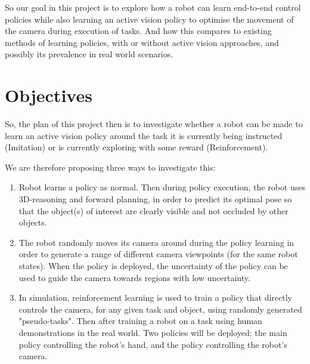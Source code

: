   So our goal in this project is to explore how a robot can learn end-to-end control policies while also learning an active vision policy to optimise the movement of the camera during execution of tasks. And how this compares to existing methods of learning policies, with or without active vision approaches, and possibly its prevalence in real world scenarios. 

\section{Objectives}\label{sec:intro-objectives}
    So, the plan of this project then is to investigate whether a robot can be made to learn an active vision policy around the task it is currently being instructed (Imitation) or is currently exploring with some reward (Reinforcement).

    We are therefore proposing three ways to investigate this:
    \begin{enumerate}
      \item Robot learns a policy as normal. Then during policy execution, the robot uses 3D-reasoning and forward planning, in order to predict its optimal pose so that the object(s) of interest are clearly visible and not occluded by other objects.
      \item The robot randomly moves its camera around during the policy learning in order to generate a range of different camera viewpoints (for the same robot states). When the policy is deployed, the uncertainty of the policy can be used to guide the camera towards regions with low uncertainty.
      \item In simulation, reinforcement learning is used to train a policy that directly controls the camera, for any given task and object, using randomly generated "pseudo-tasks". Then after training a robot on a task using human demonstrations in the real world. Two policies will be deployed: the main policy controlling the robot's hand, and the policy controlling the robot's camera.
\end{enumerate}

